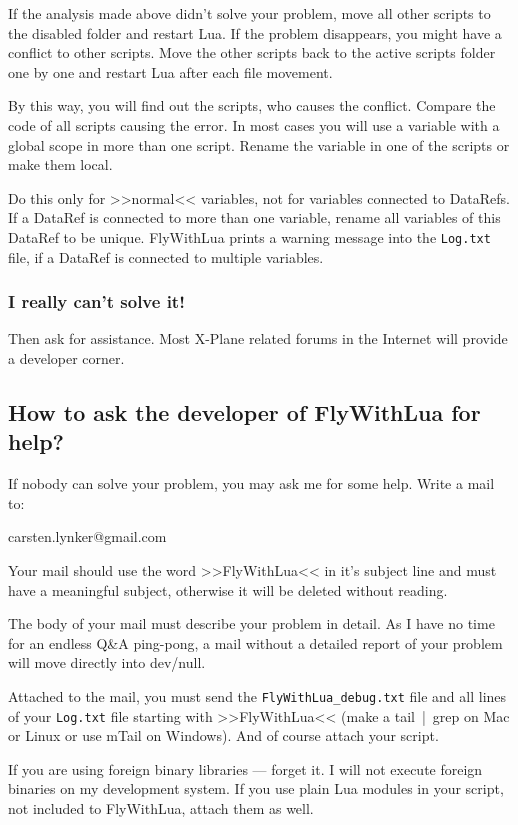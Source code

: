 \documentclass[11pt,parskip=half,a4paper]{scrartcl}
\begin{document}
If the analysis made above didn't solve your problem, move all other scripts to the disabled folder and restart Lua. If the problem disappears, you might have a conflict to other scripts. Move the other scripts back to the active scripts folder one by one and restart Lua after each file movement. 

By this way, you will find out the scripts, who causes the conflict. Compare the code of all scripts causing the error. In most cases you will use a variable with a global scope in more than one script. Rename the variable in one of the scripts or make them local.

Do this only for >>normal<< variables, not for variables connected to DataRefs. If a DataRef is connected to more than one variable, rename all variables of this DataRef to be unique. FlyWithLua prints a warning message into the \verb|Log.txt| file, if a DataRef is connected to multiple variables.

\subsubsection{I really can't solve it!}

Then ask for assistance. Most X-Plane related forums in the Internet will provide a developer corner.

\subsection{How to ask the developer of FlyWithLua for help?}

If nobody can solve your problem, you may ask me for some help. Write a mail to:

carsten.lynker@gmail.com

Your mail should use the word >>FlyWithLua<< in it's subject line and must have a meaningful subject, otherwise it will be deleted without reading.

The body of your mail must describe your problem in detail. As I have no time for an endless Q\&A ping-pong, a mail without a detailed report of your problem will move directly into dev/null.

Attached to the mail, you must send the \verb|FlyWithLua_debug.txt| file and all lines of your \verb|Log.txt| file starting with >>FlyWithLua<< (make a tail~|~grep on Mac or Linux or use mTail on Windows). And of course attach your script.

If you are using foreign binary libraries --- forget it. I will not execute foreign binaries on my development system. If you use plain Lua modules in your script, not included to FlyWithLua, attach them as well.
\end{document}
